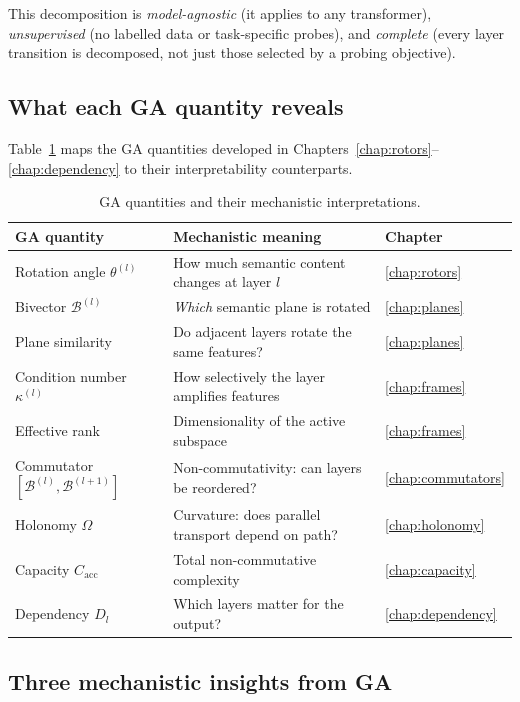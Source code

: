 \documentclass[11pt, twoside, openright]{memoir}
\newcommand{\bivec}[1]{\mathcal{B}^{(#1)}}  %
\numberwithin{equation}{chapter}
\begin{document}
\noindent
This decomposition is \emph{model-agnostic} (it applies to any
transformer), \emph{unsupervised} (no labelled data or task-specific
probes), and \emph{complete} (every layer transition is decomposed,
not just those selected by a probing objective).

\subsection{What each GA quantity reveals}

Table~\ref{tab:ga-interp} maps the GA quantities developed in
Chapters~\ref{chap:rotors}--\ref{chap:dependency} to their
interpretability counterparts.

\begin{table}[ht]
\centering\small
\renewcommand{\arraystretch}{1.4}
\begin{tabular}{@{}l l l@{}}
\toprule
\rowcolor{Navy!15}
\textbf{GA quantity} & \textbf{Mechanistic meaning} &
  \textbf{Chapter} \\
\midrule
Rotation angle $\theta^{(l)}$ &
  How much semantic content changes at layer $l$ &
  \ref{chap:rotors} \\
Bivector $\bivec{l}$ &
  \emph{Which} semantic plane is rotated &
  \ref{chap:planes} \\
Plane similarity &
  Do adjacent layers rotate the same features? &
  \ref{chap:planes} \\
Condition number $\kappa^{(l)}$ &
  How selectively the layer amplifies features &
  \ref{chap:frames} \\
Effective rank &
  Dimensionality of the active subspace &
  \ref{chap:frames} \\
Commutator $[\bivec{l}, \bivec{l+1}]$ &
  Non-commutativity: can layers be reordered? &
  \ref{chap:commutators} \\
Holonomy $\Omega$ &
  Curvature: does parallel transport depend on path? &
  \ref{chap:holonomy} \\
Capacity $C_{\mathrm{acc}}$ &
  Total non-commutative complexity &
  \ref{chap:capacity} \\
Dependency $D_l$ &
  Which layers matter for the output? &
  \ref{chap:dependency} \\
\bottomrule
\end{tabular}
\caption{GA quantities and their mechanistic interpretations.}
\label{tab:ga-interp}
\end{table}

\subsection{Three mechanistic insights from GA}
\end{document}
